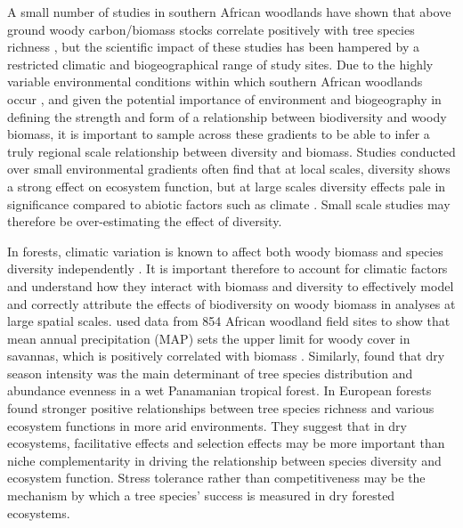\documentclass[11pt,a4paper]{article}
\begin{document}
A small number of studies in southern African woodlands have shown that above ground woody carbon/biomass stocks correlate positively with tree species richness \citep{McNicol2018, Shirima2015, Mutowo2012}, but the scientific impact of these studies has been hampered by a restricted climatic and biogeographical range of study sites. Due to the highly variable environmental conditions within which southern African woodlands occur \citep{Frost1996}, and given the potential importance of environment and biogeography in defining the strength and form of a relationship between biodiversity and woody biomass, it is important to sample across these gradients to be able to infer a truly regional scale relationship between diversity and biomass. Studies conducted over small environmental gradients often find that at local scales, diversity shows a strong effect on ecosystem function, but at large scales diversity effects pale in significance compared to abiotic factors such as climate \citep{Pasari2013}. Small scale studies may therefore be over-estimating the effect of diversity.

In forests, climatic variation is known to affect both woody biomass \citep{Michaletz2014, Michaletz2018} and species diversity independently \citep{Spasojevic2014}. It is important therefore to account for climatic factors and understand how they interact with biomass and diversity to effectively model and correctly attribute the effects of biodiversity on woody biomass in analyses at large spatial scales. \citet{Sankaran2005} used data from 854 African woodland field sites to show that mean annual precipitation (MAP) sets the upper limit for woody cover in savannas, which is positively correlated with biomass \citep{Chisholm2013, Prado-Junior2016}. Similarly, \citet{Condit2013} found that dry season intensity was the main determinant of tree species distribution and abundance evenness in a wet Panamanian tropical forest. In European forests \citep{Ratcliffe2017} found stronger positive relationships between tree species richness and various ecosystem functions in more arid environments. They suggest that in dry ecosystems, facilitative effects and selection effects may be more important than niche complementarity in driving the relationship between species diversity and ecosystem function. Stress tolerance rather than competitiveness may be the mechanism by which a tree species' success is measured in dry forested ecosystems.

\end{document}
